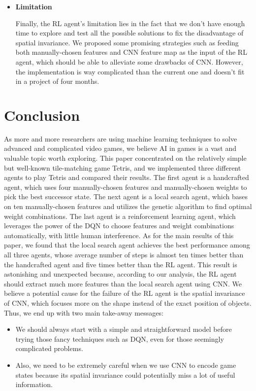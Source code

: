 \documentclass[letterpaper]{article} %
\begin{document}
\begin{itemize}
  \item \textbf{Limitation}
  
  Finally, the RL agent's limitation lies in the fact that we don't have enough time to explore and test all the possible solutions to fix the disadvantage of spatial invariance. We proposed some promising strategies such as feeding both manually-chosen features and CNN feature map as the input of the RL agent, which should be able to alleviate some drawbacks of CNN. However, the implementation is way complicated than the current one and doesn't fit in a project of four months.
  
\end{itemize}
  
  

\section{Conclusion}


As more and more researchers are using machine learning techniques to solve advanced and complicated video games, we believe AI in games is a vast and valuable topic worth exploring. This paper concentrated on the relatively simple but well-known tile-matching game Tetris, and we implemented three different agents to play Tetris and compared their results. The first agent is a handcrafted agent, which uses four manually-chosen features and manually-chosen weights to pick the best successor state. The next agent is a local search agent, which bases on ten manually-chosen features and utilizes the genetic algorithm to find optimal weight combinations. The last agent is a reinforcement learning agent, which leverages the power of the DQN to choose features and weight combinations automatically, with little human interference. As for the main results of this paper, we found that the local search agent achieves the best performance among all three agents, whose average number of steps is almost ten times better than the handcrafted agent and five times better than the RL agent. This result is astonishing and unexpected because, according to our analysis, the RL agent should extract much more features than the local search agent using CNN. We believe a potential cause for the failure of the RL agent is the spatial invariance of CNN, which focuses more on the shape instead of the exact position of objects. Thus, we end up with two main take-away messages:
\begin{itemize}
  \item 
  We should always start with a simple and straightforward model before trying those fancy techniques such as DQN, even for those seemingly complicated problems.
  \item 
  Also, we need to be extremely careful when we use CNN to encode game states because its spatial invariance could potentially miss a lot of useful information.
\end{itemize}
\end{document}
